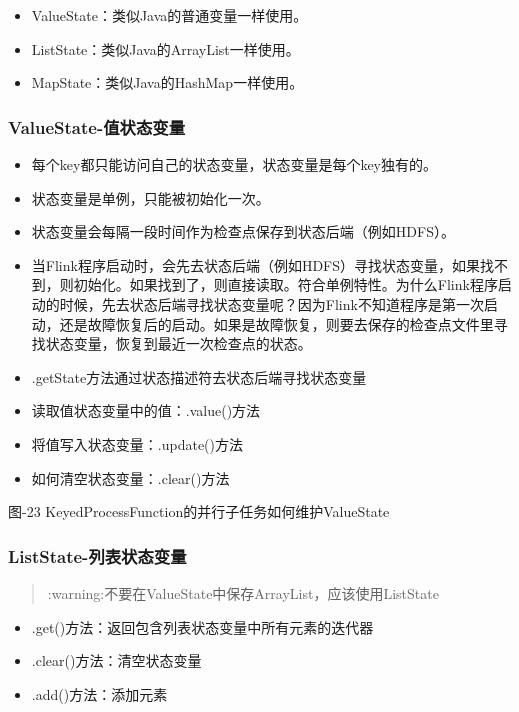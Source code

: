 \begin{itemize}
\tightlist
\item
  ValueState：类似Java的普通变量一样使用。
\item
  ListState：类似Java的ArrayList一样使用。
\item
  MapState：类似Java的HashMap一样使用。
\end{itemize}

\hypertarget{valuestate-ux503cux72b6ux6001ux53d8ux91cf}{%
\subsubsection{ValueState-值状态变量}\label{valuestate-ux503cux72b6ux6001ux53d8ux91cf}}

\begin{itemize}
\tightlist
\item
  每个key都只能访问自己的状态变量，状态变量是每个key独有的。
\item
  状态变量是{单例}，只能被初始化一次。
\item
  状态变量会每隔一段时间作为检查点保存到状态后端（例如HDFS）。
\item
  当Flink程序启动时，会先去状态后端（例如HDFS）寻找状态变量，如果找不到，则初始化。如果找到了，则直接读取。符合单例特性。为什么Flink程序启动的时候，先去状态后端寻找状态变量呢？因为Flink不知道程序是第一次启动，还是故障恢复后的启动。如果是故障恢复，则要去保存的检查点文件里寻找状态变量，恢复到最近一次检查点的状态。
\item
  .getState方法通过状态描述符去状态后端寻找状态变量
\item
  读取值状态变量中的值：.value()方法
\item
  将值写入状态变量：.update()方法
\item
  如何清空状态变量：.clear()方法
\end{itemize}

图-23 KeyedProcessFunction的并行子任务如何维护ValueState

\hypertarget{liststate-ux5217ux8868ux72b6ux6001ux53d8ux91cf}{%
\subsubsection{ListState-列表状态变量}\label{liststate-ux5217ux8868ux72b6ux6001ux53d8ux91cf}}

\begin{quote}
:warning:不要在ValueState中保存ArrayList，应该使用ListState
\end{quote}

\begin{itemize}
\tightlist
\item
  .get()方法：返回包含列表状态变量中所有元素的迭代器
\item
  .clear()方法：清空状态变量
\item
  .add()方法：添加元素
\end{itemize}

